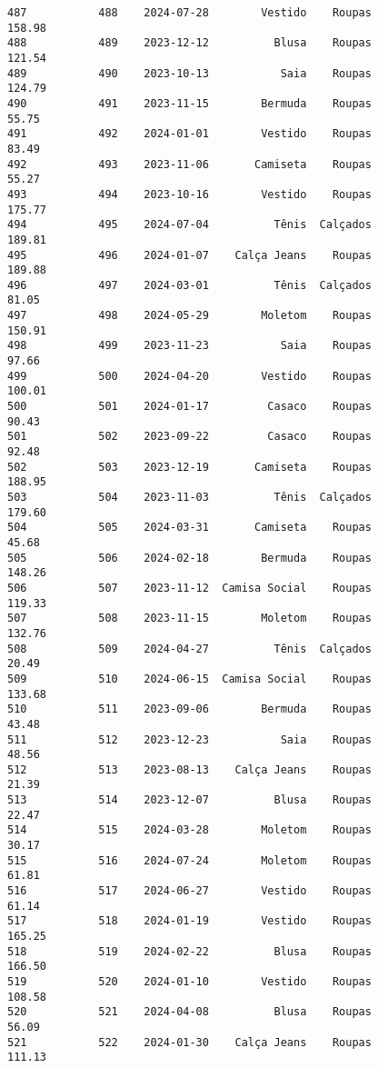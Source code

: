 \documentclass[11pt]{article}
\begin{document}
\begin{Verbatim}[commandchars=\\\{\}]
487           488    2024-07-28        Vestido    Roupas          158.98   
488           489    2023-12-12          Blusa    Roupas          121.54   
489           490    2023-10-13           Saia    Roupas          124.79   
490           491    2023-11-15        Bermuda    Roupas           55.75   
491           492    2024-01-01        Vestido    Roupas           83.49   
492           493    2023-11-06       Camiseta    Roupas           55.27   
493           494    2023-10-16        Vestido    Roupas          175.77   
494           495    2024-07-04          Tênis  Calçados          189.81   
495           496    2024-01-07    Calça Jeans    Roupas          189.88   
496           497    2024-03-01          Tênis  Calçados           81.05   
497           498    2024-05-29        Moletom    Roupas          150.91   
498           499    2023-11-23           Saia    Roupas           97.66   
499           500    2024-04-20        Vestido    Roupas          100.01   
500           501    2024-01-17         Casaco    Roupas           90.43   
501           502    2023-09-22         Casaco    Roupas           92.48   
502           503    2023-12-19       Camiseta    Roupas          188.95   
503           504    2023-11-03          Tênis  Calçados          179.60   
504           505    2024-03-31       Camiseta    Roupas           45.68   
505           506    2024-02-18        Bermuda    Roupas          148.26   
506           507    2023-11-12  Camisa Social    Roupas          119.33   
507           508    2023-11-15        Moletom    Roupas          132.76   
508           509    2024-04-27          Tênis  Calçados           20.49   
509           510    2024-06-15  Camisa Social    Roupas          133.68   
510           511    2023-09-06        Bermuda    Roupas           43.48   
511           512    2023-12-23           Saia    Roupas           48.56   
512           513    2023-08-13    Calça Jeans    Roupas           21.39   
513           514    2023-12-07          Blusa    Roupas           22.47   
514           515    2024-03-28        Moletom    Roupas           30.17   
515           516    2024-07-24        Moletom    Roupas           61.81   
516           517    2024-06-27        Vestido    Roupas           61.14   
517           518    2024-01-19        Vestido    Roupas          165.25   
518           519    2024-02-22          Blusa    Roupas          166.50   
519           520    2024-01-10        Vestido    Roupas          108.58   
520           521    2024-04-08          Blusa    Roupas           56.09   
521           522    2024-01-30    Calça Jeans    Roupas          111.13   

\end{Verbatim}
\end{document}
